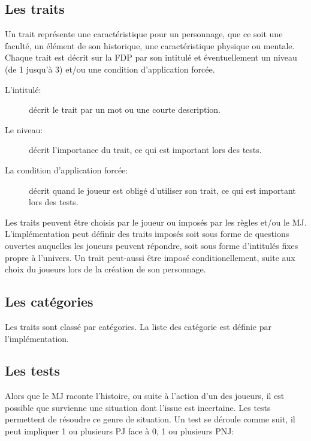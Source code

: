 \documentclass[a4paper,10pt,twoside,twocolumn]{article}
\begin{document}
 \subsection{Les traits}
 \label{rule::traits}
 
 Un trait représente une caractéristique pour un personnage, que ce soit une faculté, un élément de son historique, une caractéristique physique ou mentale. Chaque trait est décrit sur la FDP par son intitulé et éventuellement un niveau (de 1 jusqu'à 3) et/ou une condition d'application forcée.
 
 \begin{description}
  \item[L'intitulé:] décrit le trait par un mot ou une courte description.
  \item[Le niveau:] décrit l'importance du trait, ce qui est important lors des tests.
  \item[La condition d'application forcée:] décrit quand le joueur est obligé d'utiliser son trait, ce qui est important lors des tests.
 \end{description}
 
 Les traits peuvent être choisis par le joueur ou imposés par les règles et/ou le MJ. L'implémentation peut définir des traits imposés soit sous forme de questions ouvertes auquelles les joueurs peuvent répondre, soit sous forme d'intitulés fixes propre à l'univers. Un trait peut-aussi être imposé conditionellement, suite aux choix du joueurs lors de la création de son personnage.
 
 \subsection{Les catégories}
 \label{rule::cat}
 
 Les traits sont classé par catégories. La liste des catégorie est définie par l'implémentation.
 
 \subsection{Les tests}
 \label{rule::test}
 
 Alors que le MJ raconte l'histoire, ou suite à l'action d'un des joueurs, il est possible que survienne une situation dont l'issue est incertaine. Les tests permettent de résoudre ce genre de situation. Un test se déroule comme suit, il peut impliquer 1 ou plusieurs PJ face à 0, 1 ou plusieurs PNJ:
 
\end{document}
